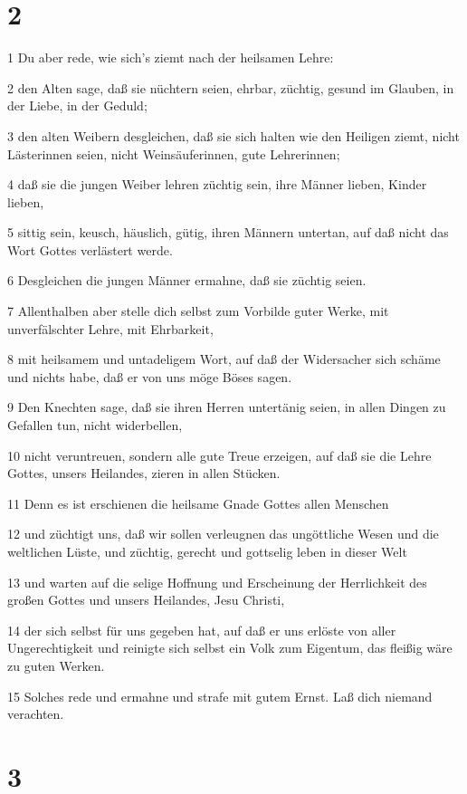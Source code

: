 \chapter{2}

\par 1 Du aber rede, wie sich's ziemt nach der heilsamen Lehre:
\par 2 den Alten sage, daß sie nüchtern seien, ehrbar, züchtig, gesund im Glauben, in der Liebe, in der Geduld;
\par 3 den alten Weibern desgleichen, daß sie sich halten wie den Heiligen ziemt, nicht Lästerinnen seien, nicht Weinsäuferinnen, gute Lehrerinnen;
\par 4 daß sie die jungen Weiber lehren züchtig sein, ihre Männer lieben, Kinder lieben,
\par 5 sittig sein, keusch, häuslich, gütig, ihren Männern untertan, auf daß nicht das Wort Gottes verlästert werde.
\par 6 Desgleichen die jungen Männer ermahne, daß sie züchtig seien.
\par 7 Allenthalben aber stelle dich selbst zum Vorbilde guter Werke, mit unverfälschter Lehre, mit Ehrbarkeit,
\par 8 mit heilsamem und untadeligem Wort, auf daß der Widersacher sich schäme und nichts habe, daß er von uns möge Böses sagen.
\par 9 Den Knechten sage, daß sie ihren Herren untertänig seien, in allen Dingen zu Gefallen tun, nicht widerbellen,
\par 10 nicht veruntreuen, sondern alle gute Treue erzeigen, auf daß sie die Lehre Gottes, unsers Heilandes, zieren in allen Stücken.
\par 11 Denn es ist erschienen die heilsame Gnade Gottes allen Menschen
\par 12 und züchtigt uns, daß wir sollen verleugnen das ungöttliche Wesen und die weltlichen Lüste, und züchtig, gerecht und gottselig leben in dieser Welt
\par 13 und warten auf die selige Hoffnung und Erscheinung der Herrlichkeit des großen Gottes und unsers Heilandes, Jesu Christi,
\par 14 der sich selbst für uns gegeben hat, auf daß er uns erlöste von aller Ungerechtigkeit und reinigte sich selbst ein Volk zum Eigentum, das fleißig wäre zu guten Werken.
\par 15 Solches rede und ermahne und strafe mit gutem Ernst. Laß dich niemand verachten.

\chapter{3}

